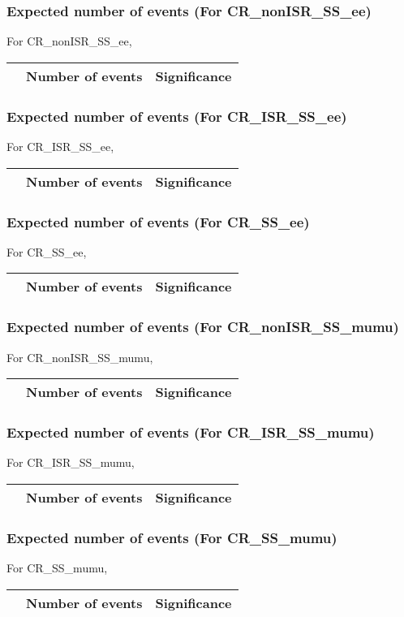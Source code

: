 \begin{frame}
\frametitle{Expected number of events (For CR\_nonISR\_SS\_ee)}
For CR\_nonISR\_SS\_ee,\\
\vspace{5mm}
\begin{tabular}{|c|c|c|}
\hline
& Number of events & Significance \\
\hline

\end{tabular}
\end{frame}

\begin{frame}
\frametitle{Expected number of events (For CR\_ISR\_SS\_ee)}
For CR\_ISR\_SS\_ee,\\
\vspace{5mm}
\begin{tabular}{|c|c|c|}
\hline
& Number of events & Significance \\
\hline

\end{tabular}
\end{frame}

\begin{frame}
\frametitle{Expected number of events (For CR\_SS\_ee)}
For CR\_SS\_ee,\\
\vspace{5mm}
\begin{tabular}{|c|c|c|}
\hline
& Number of events & Significance \\
\hline

\end{tabular}
\end{frame}

\begin{frame}
\frametitle{Expected number of events (For CR\_nonISR\_SS\_mumu)}
For CR\_nonISR\_SS\_mumu,\\
\vspace{5mm}
\begin{tabular}{|c|c|c|}
\hline
& Number of events & Significance \\
\hline

\end{tabular}
\end{frame}

\begin{frame}
\frametitle{Expected number of events (For CR\_ISR\_SS\_mumu)}
For CR\_ISR\_SS\_mumu,\\
\vspace{5mm}
\begin{tabular}{|c|c|c|}
\hline
& Number of events & Significance \\
\hline

\end{tabular}
\end{frame}

\begin{frame}
\frametitle{Expected number of events (For CR\_SS\_mumu)}
For CR\_SS\_mumu,\\
\vspace{5mm}
\begin{tabular}{|c|c|c|}
\hline
& Number of events & Significance \\
\hline

\end{tabular}
\end{frame}

